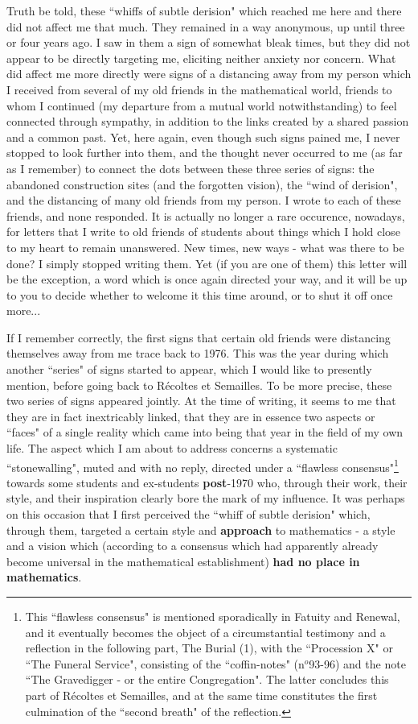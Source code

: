 Truth be told, these ``whiffs of subtle derision" which reached me here and there did not affect me that much. They remained in a way anonymous, up until three or four years ago. I saw in them a sign of somewhat bleak times, but they did not appear to be directly targeting me, eliciting neither anxiety nor concern. What did affect me more directly were signs of a distancing away from my person which I received from several of my old friends in the mathematical world, friends to whom I continued (my departure from a mutual world notwithstanding) to feel connected through sympathy, in addition to the links created by a shared passion and a common past. Yet, here again, even though such signs pained me, I never stopped to look further into them, and the thought never occurred to me (as far as I remember) to connect the dots between these three series of signs: the abandoned construction sites (and the forgotten vision), the ``wind of derision", and the distancing of many old friends from my person. I wrote to each of these friends, and none responded. It is actually no longer a rare occurence, nowadays, for letters that I write to old friends of students about things which I hold close to my heart to remain unanswered. New times, new ways - what was there to be done? I simply stopped writing them. Yet (if you are one of them) this letter will be the exception, a word which is once again directed your way, and it will be up to you to decide whether to welcome it this time around, or to shut it off once more...

If I remember correctly, the first signs that certain old friends were distancing themselves away from me trace back to 1976. This was the year during which another ``series" of signs started to appear, which I would like to presently mention, before going back to R\'ecoltes et Semailles. To be more precise, these two series of signs appeared jointly. At the time of writing, it seems to me that they are in fact inextricably linked, that they are in essence two aspects or ``faces" of a single reality which came into being that year in the field of my own life. The aspect which I am about to address concerns a systematic ``stonewalling", muted and with no reply, directed under a ``flawless consensus"\footnote{This ``flawless consensus" is mentioned sporadically in Fatuity and Renewal, and it eventually becomes the object of a circumstantial testimony and a reflection in the following part, The Burial (1), with the ``Procession X" or ``The Funeral Service", consisting of the ``coffin-notes" (n$^o$93-96) and the note ``The Gravedigger - or the entire Congregation". 
 The latter concludes this part of R\'ecoltes et Semailles, and at the same time constitutes the first culmination of the ``second breath" of the reflection.} towards some students and ex-students \textbf{post}-1970 who, through their work, their style, and their inspiration clearly bore the mark of my influence. It was perhaps on this occasion that I first perceived the ``whiff of subtle derision" which, through them, targeted a certain style and \textbf{approach} to mathematics - a style and a vision which (according to a consensus which had apparently already become universal in the mathematical establishment) \textbf{had no place in mathematics}.

